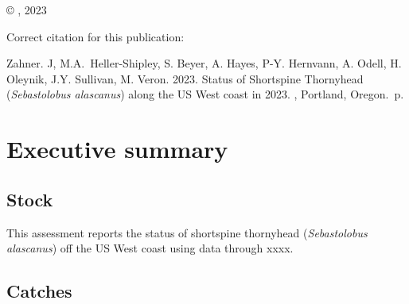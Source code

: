 \documentclass[11pt,
  english,
  letterpaper,
]{article}
\newcommand{\trTitle}{Status of Shortspine Thornyhead (\emph{Sebastolobus alascanus}) along the US West coast in 2023}
\newcommand{\trYear}{2023}
\newcommand{\trAuthsBack}{Zahner. J, M.A.~Heller-Shipley, S. Beyer, A. Hayes, P-Y. Hernvann, A. Odell, H. Oleynik, J.Y. Sullivan, M. Veron}
\newcommand{\trCitation}{
\begin{hangparas}{1em}{1}
\trAuthsBack{}. \trYear{}. \trTitle{}. \glsentrylong{pfmc}, Portland, Oregon. \pageref{LastPage}{}\,p.
\end{hangparas}}
\begin{document}
\thispagestyle{empty}
\vspace*{\fill}
\begin{center}
\copyright{} , \trYear{}\\
\end{center}
\par
\bigskip
\noindent
Correct citation for this publication:
\bigskip
\par
\trCitation{}
\clearpage


\tableofcontents\clearpage
\label{TRlastRoman}
\clearpage

\newpage
\thispagestyle{empty} %

\pagestyle{plain}  %
\renewcommand*{\thefootnote}{\arabic{footnote}}  %
\setcounter{footnote}{0}  %
\renewcommand{\headrulewidth}{0.5pt}
\renewcommand{\footrulewidth}{0.5pt}

\newcommand{\lt}{\ensuremath <}
\newcommand{\gt}{\ensuremath >}

\pagebreak
{}
\setcounter{page}{1}

\renewcommand{\thetable}{\roman{table}}
\renewcommand{\thefigure}{\roman{figure}}

\setlength\parskip{0.5em plus 0.1em minus 0.2em}

\hypertarget{executive-summary}{%
\section*{Executive summary}\label{executive-summary}}

\hypertarget{stock}{%
\subsection*{Stock}\label{stock}}

This assessment reports the status of shortspine thornyhead (\emph{Sebastolobus alascanus}) off the US West coast using data through xxxx.

\hypertarget{catches}{%
\subsection*{Catches}\label{catches}}
\end{document}
